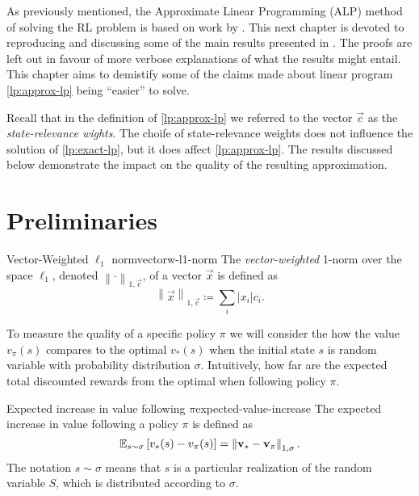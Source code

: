 \label{chapter:PropertiesGuarantees}
As previously mentioned, the Approximate Linear Programming (ALP) method of
solving the RL problem is based on work by \citeauthor{farias2003LP2ADP}. This
next chapter is devoted to reproducing and discussing some of the main results
presented in \cite{farias2003LP2ADP}. The proofs are left out in favour of more
verbose explanations of what the results might entail. This chapter aims to
demistify some of the claims made about linear program \eqref{lp:approx-lp}
being ``easier'' to solve.

Recall that in the definition of \eqref{lp:approx-lp} we referred to the vector
$\vec{c}$ as the \emph{state-relevance wights}. The choife of state-relevance
weights does not influence the solution of \eqref{lp:exact-lp}, but it does
affect \eqref{lp:approx-lp}. The results discussed below demonstrate the impact
on the quality of the resulting approximation.

\section{Preliminaries}

\begin{dfn}{Vector-Weighted $\ell_1$ norm}{vectorw-l1-norm}
    The \emph{vector-weighted} 1-norm over the space $\ell_1$, denoted $\left\| \cdot \right\|_{1, \vec{c}}$, of a vector $\vec{x}$ is defined as
    \begin{equation*}
        \left\| \vec{x} \right\|_{1, \vec{c}} \coloneqq  \sum_i |x_i| c_i.
    \end{equation*}
\end{dfn}

To measure the quality of a specific policy $\pi$ we will consider the how the
value $v_\pi(s)$ compares to the optimal $v_* (s)$ when the initial state $s$ is
random variable with probability distribution $\sigma$. Intuitively, how far are
the expected total discounted rewards from the optimal when following policy
$\pi$.

\begin{dfn}{Expected increase in value following $\pi$}{expected-value-increase}
    The expected increase in value following a policy $\pi$ is defined as
    \begin{equation}
        \label{eq:expected-value-increase}
        \mathbb{E}_{s \sim \sigma} \left[ v_* (s) - v_\pi (s) \right] = \left\| \mathbf{v
        }_* - \mathbf{v}_\pi \right\|_{1, \sigma}.
    \end{equation}
    The notation $s \sim \sigma$ means that $s$ is a particular realization of the
    random variable $S$, which is distributed according to $\sigma$.
\end{dfn}

